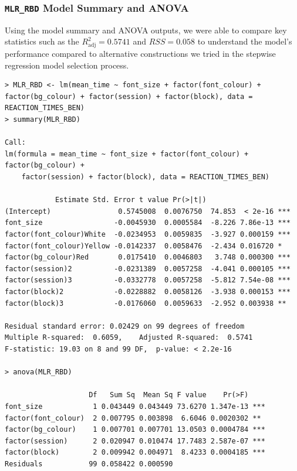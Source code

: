 \documentclass[12pt]{article}
\begin{document}
\subsubsection{\texttt{MLR\_RBD} Model Summary and ANOVA}\label{app:model_summary}
\vspace{0.2cm}

Using the model summary and ANOVA outputs, we were able to compare key statistics such as the $R^2_{\text{adj}} = 0.5741$ and $RSS=0.058$ to understand the model's performance compared to alternative constructions we tried in the stepwise regression model selection process.

\begin{lstlisting}[style=RStudioNonum]
> MLR_RBD <- lm(mean_time ~ font_size + factor(font_colour) + factor(bg_colour) + factor(session) + factor(block), data = REACTION_TIMES_BEN)
> summary(MLR_RBD)

Call:
lm(formula = mean_time ~ font_size + factor(font_colour) + factor(bg_colour) + 
    factor(session) + factor(block), data = REACTION_TIMES_BEN)

            Estimate Std. Error t value Pr(>|t|)    
(Intercept)                0.5745008  0.0076750  74.853  < 2e-16 ***
font_size                 -0.0045930  0.0005584  -8.226 7.86e-13 ***
factor(font_colour)White  -0.0234953  0.0059835  -3.927 0.000159 ***
factor(font_colour)Yellow -0.0142337  0.0058476  -2.434 0.016720 *  
factor(bg_colour)Red       0.0175410  0.0046803   3.748 0.000300 ***
factor(session)2          -0.0231389  0.0057258  -4.041 0.000105 ***
factor(session)3          -0.0332778  0.0057258  -5.812 7.54e-08 ***
factor(block)2            -0.0228882  0.0058126  -3.938 0.000153 ***
factor(block)3            -0.0176060  0.0059633  -2.952 0.003938 ** 

Residual standard error: 0.02429 on 99 degrees of freedom
Multiple R-squared:  0.6059,	Adjusted R-squared:  0.5741 
F-statistic: 19.03 on 8 and 99 DF,  p-value: < 2.2e-16

> anova(MLR_RBD)

                    Df   Sum Sq  Mean Sq F value    Pr(>F)    
font_size            1 0.043449 0.043449 73.6270 1.347e-13 ***
factor(font_colour)  2 0.007795 0.003898  6.6046 0.0020302 ** 
factor(bg_colour)    1 0.007701 0.007701 13.0503 0.0004784 ***
factor(session)      2 0.020947 0.010474 17.7483 2.587e-07 ***
factor(block)        2 0.009942 0.004971  8.4233 0.0004185 ***
Residuals           99 0.058422 0.000590                      
\end{lstlisting}
\vspace{-0.3cm}
\end{document}
